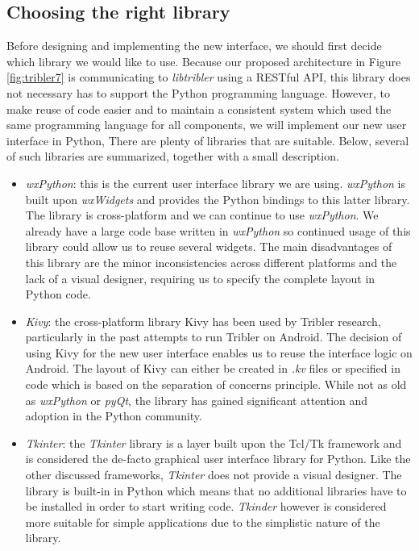 \subsection{Choosing the right library}
Before designing and implementing the new interface, we should first decide which library we would like to use. Because our proposed architecture in Figure \ref{fig:tribler7} is communicating to \emph{libtribler} using a RESTful API, this library does not necessary has to support the Python programming language. However, to make reuse of code easier and to maintain a consistent system which used the same programming language for all components, we will implement our new user interface in Python, There are plenty of libraries that are suitable. Below, several of such libraries are summarized, together with a small description.
\begin{itemize}
	\item \emph{wxPython}\cite{rappin2006wxpython}: this is the current user interface library we are using. \emph{wxPython} is built upon \emph{wxWidgets} and provides the Python bindings to this latter library. The library is cross-platform and we can continue to use \emph{wxPython}. We already have a large code base written in \emph{wxPython} so continued usage of this library could allow us to reuse several widgets. The main disadvantages of this library are the minor inconsistencies across different platforms and the lack of a visual designer, requiring us to specify the complete layout in Python code.
	\item \emph{Kivy}\cite{solis2015kivy}: the cross-platform library Kivy has been used by Tribler research, particularly in the past attempts to run Tribler on Android\cite{de2014android}\cite{sabee2014tribler}. The decision of using Kivy for the new user interface enables us to reuse the interface logic on Android. The layout of Kivy can either be created in \emph{.kv} files or specified in code which is based on the separation of concerns principle. While not as old as \emph{wxPython} or \emph{pyQt}, the library has gained significant attention and adoption in the Python community.
	\item \emph{Tkinter}\cite{lundh1999introduction}: the \emph{Tkinter} library is a layer built upon the Tcl/Tk framework and is considered the de-facto graphical user interface library for Python. Like the other discussed frameworks, \emph{Tkinter} does not provide a visual designer. The library is built-in in Python which means that no additional libraries have to be installed in order to start writing code. \emph{Tkinder} however is considered more suitable for simple applications due to the simplistic nature of the library.

\end{itemize}
